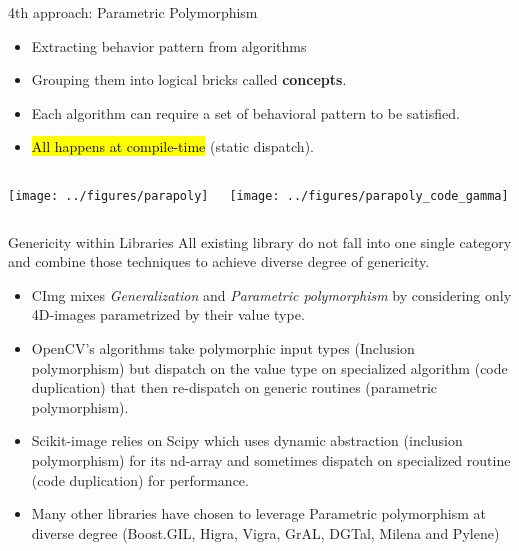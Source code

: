\documentclass[12pt,aspectratio=169]{beamer}
\makeatletter
\let\HL\hl
\renewcommand\hl{%
  \let\set@color\beamerorig@set@color
  \let\reset@color\beamerorig@reset@color
  \HL}
\makeatother
\begin{document}
\begin{frame}[fragile]{4th approach: Parametric Polymorphism}
  \begin{itemize}
    \item Extracting behavior pattern from algorithms
    \item Grouping them into logical bricks called \textbf{concepts}.
    \item Each algorithm can require a set of behavioral pattern to be satisfied.
    \item \hl{All happens at compile-time} (static dispatch).
  \end{itemize}

  \begin{columns}[T,onlytextwidth]
    \centering
    \texttt{[image: ../figures/parapoly]}

    \centering
    \texttt{[image: ../figures/parapoly\_code\_gamma]}
  \end{columns}
\end{frame}

\begin{frame}[fragile]{Genericity within Libraries}
  All existing library do not fall into one single category and combine those techniques to achieve diverse degree of
  genericity.
  \vspace{-0.2cm}\small\begin{itemize}
    \item CImg mixes \emph{Generalization} and \emph{Parametric polymorphism} by considering only 4D-images parametrized
          by their value type.
    \item OpenCV's algorithms take polymorphic input types (Inclusion polymorphism) but dispatch on the value type on
          specialized algorithm (code duplication) that then re-dispatch on generic routines (parametric polymorphism).
    \item Scikit-image relies on Scipy which uses dynamic abstraction (inclusion polymorphism) for its nd-array and
          sometimes dispatch on specialized routine (code duplication) for performance.
    \item Many other libraries have chosen to leverage Parametric polymorphism at diverse degree (Boost.GIL, Higra,
          Vigra, GrAL, DGTal, Milena and Pylene)
  \end{itemize}
\end{frame}
\end{document}
